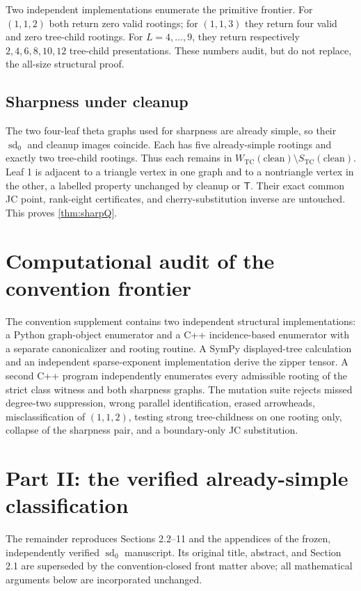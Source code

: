 \documentclass[11pt]{article}
\theoremstyle{remark}\newtheorem{remark}[theorem]{Remark}
\newcommand{\STC}{S_{\mathrm{TC}}}
\newcommand{\WTC}{W_{\mathrm{TC}}}
\newcommand{\Tmove}{\mathsf T}
\begin{document}
Two independent implementations enumerate the primitive frontier.  For $(1,1,2)$ both return zero valid rootings; for $(1,1,3)$ they return four valid and zero tree-child rootings.  For $L=4,\ldots,9$, they return respectively $2,4,6,8,10,12$ tree-child presentations.  These numbers audit, but do not replace, the all-size structural proof.

\subsection{Sharpness under cleanup}
The two four-leaf theta graphs used for sharpness are already simple, so their $\operatorname{sd}_0$ and cleanup images coincide.  Each has five already-simple rootings and exactly two tree-child rootings.  Thus each remains in $\WTC(\mathrm{clean})\setminus\STC(\mathrm{clean})$.  Leaf 1 is adjacent to a triangle vertex in one graph and to a nontriangle vertex in the other, a labelled property unchanged by cleanup or $\Tmove$.  Their exact common JC point, rank-eight certificates, and cherry-substitution inverse are untouched.  This proves \cref{thm:sharpQ}.

\section*{Computational audit of the convention frontier}
The convention supplement contains two independent structural implementations: a Python graph-object enumerator and a C++ incidence-based enumerator with a separate canonicalizer and rooting routine.  A SymPy displayed-tree calculation and an independent sparse-exponent implementation derive the zipper tensor.  A second C++ program independently enumerates every admissible rooting of the strict class witness and both sharpness graphs.  The mutation suite rejects missed degree-two suppression, wrong parallel identification, erased arrowheads, misclassification of $(1,1,2)$, testing strong tree-childness on one rooting only, collapse of the sharpness pair, and a boundary-only JC substitution.

\section*{Part II: the verified already-simple classification}
The remainder reproduces Sections 2.2--11 and the appendices of the frozen, independently verified $\operatorname{sd}_0$ manuscript.  Its original title, abstract, and Section 2.1 are superseded by the convention-closed front matter above; all mathematical arguments below are incorporated unchanged.
\clearpage

\end{document}
